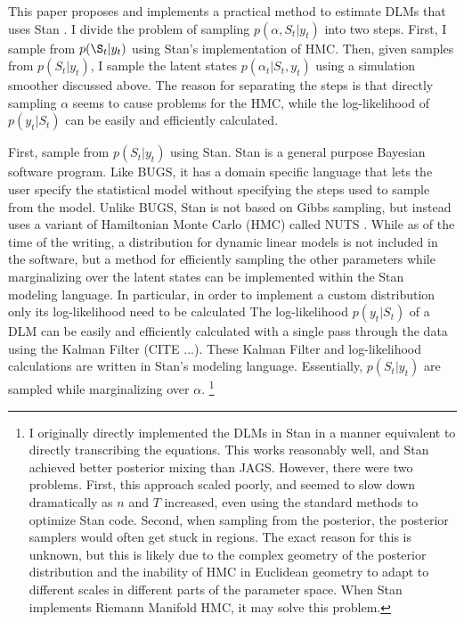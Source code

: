\documentclass{article}
\begin{document}
This paper proposes and implements a practical method to estimate DLMs that uses Stan \parencite{Stan2013}.
I divide the problem of sampling $p(\alpha, S_{t} | y_{t})$ into two steps.
First, I sample from $p(\S_{t} | y_{t})$ using Stan's implementation of HMC.
Then, given samples from $p(S_{t} | y_{t})$, I sample the latent states $p(\alpha_{t} | S_{t}, y_{t})$ using a simulation smoother discussed above.
The reason for separating the steps is that directly sampling $\alpha$ seems to cause problems for the HMC, while the log-likelihood of $p(y_{t} | S_{t})$ can be easily and efficiently calculated.

First, sample from $p(S_{t} | y_{t})$ using Stan.
Stan is a general purpose Bayesian software program.
Like BUGS, it has a domain specific language that lets the user specify the statistical model without specifying the steps used to sample from the model.
Unlike BUGS, Stan is not based on Gibbs sampling, but instead uses a variant of Hamiltonian Monte Carlo (HMC) called NUTS \parencite{HoffmanGelman2013}.
While as of the time of the writing, a distribution for dynamic linear models is not included in the software, but a method for efficiently sampling the other parameters while marginalizing over the latent states can be implemented within the Stan modeling language.
In particular, in order to implement a custom distribution only its log-likelihood need to be calculated \parencite[Chapter 17]{Stan2013}
The log-likelihood $p(y_{t} | S_{t})$ of a DLM can be easily and efficiently calculated with a single pass through the data using the Kalman Filter (CITE ...).
These Kalman Filter and log-likelihood calculations are written in Stan's modeling language.
Essentially, $p(S_{t} | y_{t})$ are sampled while marginalizing over $\alpha$.
\footnote{
  I originally directly implemented the DLMs in Stan in a manner equivalent to directly transcribing the equations.
  This works reasonably well, and Stan achieved better posterior mixing than JAGS.
  However, there were two problems. 
  First, this approach scaled poorly, and seemed to slow down dramatically as $n$ and $T$ increased, even using the standard methods to optimize Stan code.
  Second, when sampling from the posterior, the posterior samplers would often get stuck in regions.
  The exact reason for this is unknown, but this is likely due to the complex geometry of the posterior distribution and the inability of HMC in Euclidean geometry to adapt to different scales in different parts of the parameter space.
  When Stan implements Riemann Manifold HMC, it may solve this problem.
}
\end{document}
